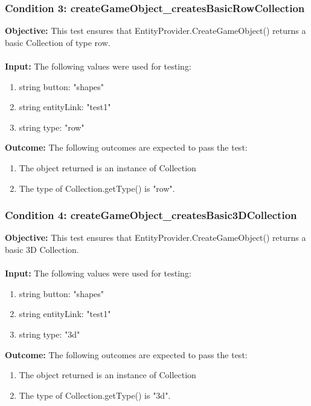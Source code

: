 \documentclass[a4paper,12pt]{article}
\begin{document}
		\subsubsection{Condition 3: createGameObject\_createsBasicRowCollection}
			\textbf{Objective:} This test ensures that EntityProvider.CreateGameObject() returns a basic Collection of type row.\\\\
			\textbf{Input:} The following values were used for testing:
				\begin{enumerate}
					\item string button: "shapes"
					\item string entityLink: "test1"
					\item string type: "row"
				\end{enumerate}
			\textbf{Outcome:} The following outcomes are expected to pass the test:
				\begin{enumerate}
					\item The object returned is an instance of Collection
					\item The type of Collection.getType() is "row".
				\end{enumerate}
		\subsubsection{Condition 4: createGameObject\_createsBasic3DCollection}
			\textbf{Objective:} This test ensures that EntityProvider.CreateGameObject() returns a basic 3D Collection.\\\\
			\textbf{Input:} The following values were used for testing:
				\begin{enumerate}
					\item string button: "shapes"
					\item string entityLink: "test1"
					\item string type: "3d"
				\end{enumerate}
			\textbf{Outcome:} The following outcomes are expected to pass the test:
				\begin{enumerate}
					\item The object returned is an instance of Collection
					\item The type of Collection.getType() is "3d".
				\end{enumerate}
\end{document}
